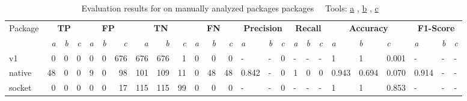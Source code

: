 \begin{table}[htp!]
    \centering
    \caption[Evaluation results for \toolSafer{} on manually analyzed packages packages]
        {Evaluation results for \toolSafer{} on manually analyzed packages packages~\newline \tiny ~\newline \footnotesize
        Tools: \underline{a} \toolSafer{}, \underline{b} \toolVet{}, \underline{c} \toolGosec{} \tiny ~\newline}
    \label{tbl:gosafer-evaluation-packages}
    \begin{adjustbox}{max width=\textwidth}
        \begin{tabular}{l||rrr|rrr|rrr|rrr||lll|lll|lll|lll}
            Package    & \multicolumn{3}{c|}{\textbf{TP}}                & \multicolumn{3}{c|}{\textbf{FP}}                 & \multicolumn{3}{c|}{\textbf{TN}}                & \multicolumn{3}{c||}{\textbf{FN}}                & \multicolumn{3}{c|}{\textbf{Precision}} & \multicolumn{3}{c|}{\textbf{Recall}}    & \multicolumn{3}{c|}{\textbf{Accuracy}} & \multicolumn{3}{c}{\textbf{F1-Score}}  \\
            {}         & \textit{a}            & \textit{b} & \textit{c} & \textit{a}             & \textit{b} & \textit{c} & \textit{a}            & \textit{b} & \textit{c} & \textit{a}             & \textit{b} & \textit{c} & \textit{a}    & \textit{b} & \textit{c} & \textit{a}    & \textit{b} & \textit{c} & \textit{a}   & \textit{b} & \textit{c} & \textit{a}   & \textit{b} & \textit{c} \\
            \hline
            v1         & 0                     & 0          & 0          & 0                      & 0          & 676        & 676                   & 676        & 1          & 0                      & 0          & 0          & -             & -          & 0          & -             & -          & -          & 1            & 1          & 0.001      & -            & -          & -          \\
            native     & 48                    & 0          & 0          & 9                      & 0          & 98         & 101                   & 109        & 11         & 0                      & 48         & 48         & 0.842         & -          & 0          & 1             & 0          & 0          & 0.943        & 0.694      & 0.070      & 0.914        & -          & -          \\
            socket     & 0                     & 0          & 0          & 0                      & 0          & 17         & 115                   & 115        & 99         & 0                      & 0          & 0          & -             & -          & 0          & -             & -          & -          & 1            & 1          & 0.853      & -            & -          & -          \\

\end{tabular}
\end{adjustbox}
\end{table}
